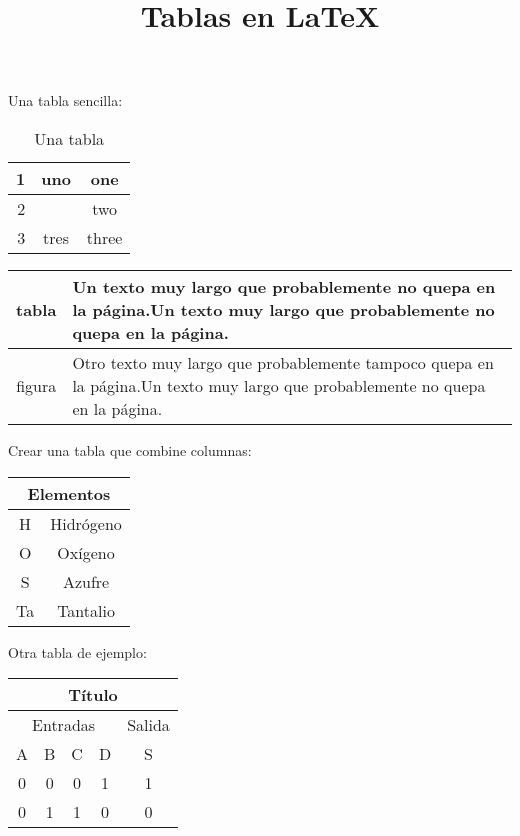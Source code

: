 \documentclass{article}
\title{Tablas en \LaTeX}
\date{}
\begin{document}
\maketitle
Una tabla sencilla:

\begin{table}
\centering
\caption{Una tabla}
\begin{tabular}{|r||c|c|}
	\hline
	1	&	uno		&	one	\\	\hline
	2	&			&	two	\\	
	3	&	tres	&	three\\	\hline \hline
\end{tabular}
\end{table}

\begin{table}
	\begin{tabular}{c|p{300pt}}
		tabla	&	Un texto muy largo que probablemente no quepa en la página.Un texto muy largo que probablemente no quepa en la página.\\ \hline
		figura	&	Otro texto muy largo que probablemente tampoco quepa en la página.Un texto muy largo que probablemente no quepa en la página.\\
	\end{tabular}
\end{table}

Crear una tabla que combine columnas:
\begin{table}[h]
	\begin{tabular}{|c|c|}
		\hline
		\multicolumn{2}{|c|}{\textbf{Elementos}} \\ \hline
		H	&	Hidrógeno	\\	\hline
		O	&	Oxígeno		\\	\hline
		S	&	Azufre		\\	\hline
		Ta	&	Tantalio	\\	\hline
	\end{tabular}
\end{table}

Otra tabla de ejemplo:
\begin{table}[h]
	\begin{tabular}{|c|c|c|c|c|}
		\hline
		\multicolumn{5}{|c|}{\textbf{Título}}		\\ \hline
		\multicolumn{4}{|c|}{Entradas}	&	Salida	\\ \hline
		A	&	B	&	C	&	D		&	S		\\ \hline
		0	&	0	&	0	&	1		&	1		\\ \hline
		0	&	1	&	1	&	0		&	0		\\ \hline
	\end{tabular}
\end{table}
\end{document}
